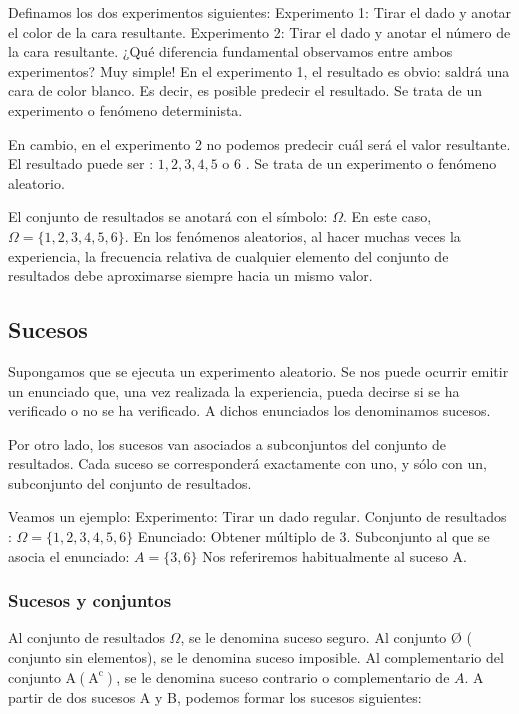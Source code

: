 \documentclass[
  a4paper,
  DIV=11,
  numbers=noendperiod]{scrreprt}
\begin{document}
Definamos los dos experimentos siguientes: Experimento 1: Tirar el dado
y anotar el color de la cara resultante. Experimento 2: Tirar el dado y
anotar el número de la cara resultante. ¿Qué diferencia fundamental
observamos entre ambos experimentos? Muy simple! En el experimento 1, el
resultado es obvio: saldrá una cara de color blanco. Es decir, es
posible predecir el resultado. Se trata de un experimento o fenómeno
determinista.

En cambio, en el experimento 2 no podemos predecir cuál será el valor
resultante. El resultado puede ser : \(1,2,3,4,5\) o 6 . Se trata de un
experimento o fenómeno aleatorio.

El conjunto de resultados se anotará con el símbolo: \(\Omega\). En este
caso, \(\Omega=\{1,2,3,4,5,6\}\). En los fenómenos aleatorios, al hacer
muchas veces la experiencia, la frecuencia relativa de cualquier
elemento del conjunto de resultados debe aproximarse siempre hacia un
mismo valor.

\subsection{Sucesos}\label{sucesos}

Supongamos que se ejecuta un experimento aleatorio. Se nos puede ocurrir
emitir un enunciado que, una vez realizada la experiencia, pueda decirse
si se ha verificado o no se ha verificado. A dichos enunciados los
denominamos sucesos.

Por otro lado, los sucesos van asociados a subconjuntos del conjunto de
resultados. Cada suceso se corresponderá exactamente con uno, y sólo con
un, subconjunto del conjunto de resultados.

Veamos un ejemplo: Experimento: Tirar un dado regular. Conjunto de
resultados : \(\Omega=\{1,2,3,4,5,6\}\) Enunciado: Obtener múltiplo de
3. Subconjunto al que se asocia el enunciado: \(A=\{3,6\}\) Nos
referiremos habitualmente al suceso A.

\subsubsection{Sucesos y conjuntos}\label{sucesos-y-conjuntos}

Al conjunto de resultados \(\Omega\), se le denomina suceso seguro. Al
conjunto Ø ( conjunto sin elementos), se le denomina suceso imposible.
Al complementario del conjunto
\(\mathrm{A}\left(\mathrm{A}^{\mathrm{c}}\right)\), se le denomina
suceso contrario o complementario de \(A\). A partir de dos sucesos A y
B, podemos formar los sucesos siguientes:
\end{document}
